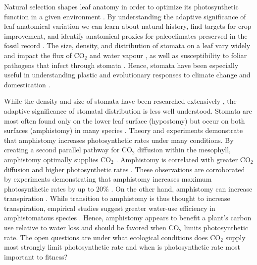 \documentclass[12pt, oneside]{article}
\begin{document}
Natural selection shapes leaf anatomy in order to optimize its photosynthetic function in a given environment \citep{Haberlandt_1914, Givnish_1987, Smith_etal_1997}. By understanding the adaptive significance of leaf anatomical variation we can learn about natural history, find targets for crop improvement, and identify anatomical proxies for paleoclimates preserved in the fossil record \citep[e.g.][]{Wolfe_1971, Royer_2001, McElwain_Steinthorsdottir_2017}. The size, density, and distribution of stomata on a leaf vary widely and impact the flux of CO$_2$ and water vapour \citep[recently reviewed in][]{Sack_Buckley_2016}, as well as susceptibility to foliar pathogens that infect through stomata \citep{Mckown_etal_2014, Melotto_etal_2017}. Hence, stomata have been especially useful in understanding plastic and evolutionary responses to climate change and domestication \citep{Woodward_1987, Beerling_Royer_2011, Milla_etal_2013}.

While the density and size of stomata have been researched extensively \citep[and references therein]{Sack_Buckley_2016}, the adaptive significance of stomatal distribution is less well understood. Stomata are most often found only on the lower leaf surface (hypostomy) but occur on both surfaces (amphistomy) in many species \citep{Metcalfe_Chalk_1950, Parkhurst_1978, Mott_etal_1982}. Theory and experiments demonstrate that amphistomy increases photosynthetic rates under many conditions. By creating a second parallel pathway for CO$_2$ diffusion within the mesophyll, amphistomy optimally supplies CO$_2$ \citep{Parkhurst_1978, Gutschick_1984b, Jones_1985}. Amphistomy is correlated with greater CO$_2$ diffusion \citep{Beerling_Kelly_1996} and higher photosynthetic rates \citep{Mckown_etal_2014}. These observations are corroborated by experiments demonstrating that amphistomy increases maximum photosynthetic rates by up to 20\% \citep{Parkhurst_Mott_1990}. On the other hand, amphistomy can increase transpiration \citep{Jones_1985, Foster_Smith_1986, Buckley_etal_2015}. While transition to amphistomy is thus thought to increase transpiration, empirical studies suggest greater water-use efficiency in amphistomatous species \citep{Bucher_etal_2017}. Hence, amphistomy appears to benefit a plant's carbon use relative to water loss and should be favored when CO$_2$ limits photosynthetic rate. The open questions are under what ecological conditions does CO$_2$ supply most strongly limit photosynthetic rate \citep{Peat_Fitter_1994b} and when is photosynthetic rate most important to fitness?
\end{document}
